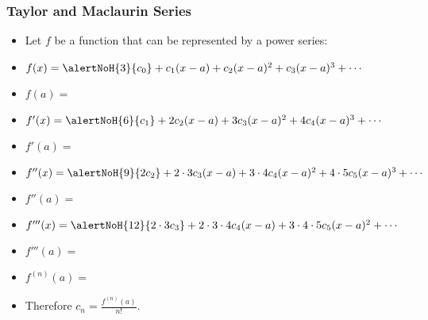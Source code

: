 \begin{frame}
\frametitle{Taylor and Maclaurin Series}
\begin{itemize}
\item  Let $f$ be a function that can be represented by a power series:
\item  $f(x) = \alertNoH{ 3}{c_0} + c_1 (x-a) + c_2 (x-a)^2 + c_3(x-a)^3 + \cdots$
\item<2-| alert@2-3>  $f(a) = $ 
\item<4->  $f'(x) = \alertNoH{ 6}{c_1}  + 2c_2 (x-a) + 3c_3(x-a)^2 + 4c_4 (x-a)^3 + \cdots$
\item<5-| alert@5-6>  $f'(a) = $ 
\item<7->  $f''(x) =  \alertNoH{ 9}{2c_2}  + 2\cdot 3c_3(x-a) + 3\cdot 4c_4 (x-a)^2 + 4\cdot 5 c_5 (x-a)^3 + \cdots$
\item<8-| alert@8-9>  $f''(a) = $ 
\item<10->  $f'''(x) =   \alertNoH{ 12}{2\cdot 3c_3} + 2\cdot 3\cdot 4c_4 (x-a) + 3\cdot 4\cdot 5  c_5(x-a)^2 + \cdots$
\item<11-| alert@11-12>  $f'''(a) = $ 
\item<13-| alert@13-14>  $f^{(n)}(a) = $ 
\item<15->  Therefore $c_n = \frac{f^{(n)}(a)}{n!}$.
\end{itemize}
\end{frame}
